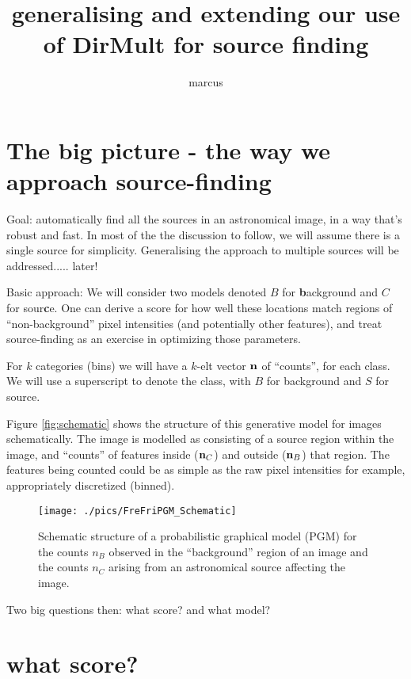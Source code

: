 \documentclass[12pt]{article}
\title{generalising and extending our use of DirMult for source finding}
\author{marcus}
\date{}
\begin{document}
\maketitle

\tableofcontents

\section{The big picture - the way we approach source-finding}

Goal: automatically find all the sources in an astronomical image, in
a way that's robust and fast.  In most of the the discussion to
follow, we will assume there is a single source for
simplicity. Generalising the approach to multiple sources will be
addressed..... later!

Basic approach: We will consider two models denoted $B$ for {\bf
  b}ackground and $C$ for sour{\bf c}e.  One can derive a score for
how well these locations match regions of ``non-background'' pixel
intensities (and potentially other features), and treat source-finding
as an exercise in optimizing those parameters.

For $k$ categories (bins) we will have a $k$-elt vector $\mathbf{n}$ of
``counts'', for each class.  We will use a superscript to denote the
class, with $B$ for background and $S$ for source.

Figure \ref{fig:schematic} shows the structure of this generative
model for images schematically. The image is modelled as consisting of
a source region within the image, and ``counts'' of features inside
($\mathbf{n}_C$) and outside ($\mathbf{n}_B$) that region. The features being
counted could be as simple as the raw pixel intensities for example,
appropriately discretized (binned).


\begin{figure}
\begin{center}
\texttt{[image: ./pics/FreFriPGM\_Schematic]} 
\end{center}
\caption{Schematic structure of a probabilistic graphical model (PGM)
  for the counts $n_B$ observed in the ``background'' region of an
  image and the counts $n_C$ arising from an astronomical source affecting the image.  \label{fig:FreFriPGM_Schematic} }
\end{figure}


Two big questions then: what score? and  what model?


\section{what score?}
\end{document}
